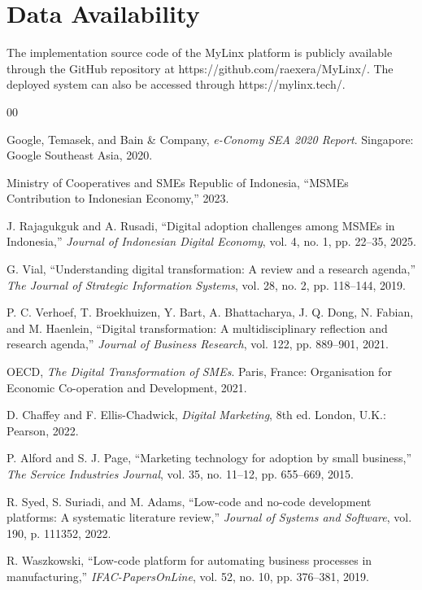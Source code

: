 \documentclass[conference]{IEEEtran}
\begin{document}
\section*{Data Availability}

The implementation source code of the MyLinx platform is publicly available through the GitHub repository at https://github.com/raexera/MyLinx/. The deployed system can also be accessed through https://mylinx.tech/.

\begin{thebibliography}{00}

 Google, Temasek, and Bain \& Company, \textit{e-Conomy SEA 2020 Report}. Singapore: Google Southeast Asia, 2020.

 Ministry of Cooperatives and SMEs Republic of Indonesia, “MSMEs Contribution to Indonesian Economy,” 2023.

 J. Rajagukguk and A. Rusadi, “Digital adoption challenges among MSMEs in Indonesia,” \textit{Journal of Indonesian Digital Economy}, vol. 4, no. 1, pp. 22--35, 2025.

 G. Vial, “Understanding digital transformation: A review and a research agenda,” \textit{The Journal of Strategic Information Systems}, vol. 28, no. 2, pp. 118--144, 2019.

 P. C. Verhoef, T. Broekhuizen, Y. Bart, A. Bhattacharya, J. Q. Dong, N. Fabian, and M. Haenlein, “Digital transformation: A multidisciplinary reflection and research agenda,” \textit{Journal of Business Research}, vol. 122, pp. 889--901, 2021.

 OECD, \textit{The Digital Transformation of SMEs}. Paris, France: Organisation for Economic Co-operation and Development, 2021.

 D. Chaffey and F. Ellis-Chadwick, \textit{Digital Marketing}, 8th ed. London, U.K.: Pearson, 2022.

 P. Alford and S. J. Page, “Marketing technology for adoption by small business,” \textit{The Service Industries Journal}, vol. 35, no. 11--12, pp. 655--669, 2015.

 R. Syed, S. Suriadi, and M. Adams, “Low-code and no-code development platforms: A systematic literature review,” \textit{Journal of Systems and Software}, vol. 190, p. 111352, 2022.

 R. Waszkowski, “Low-code platform for automating business processes in manufacturing,” \textit{IFAC-PapersOnLine}, vol. 52, no. 10, pp. 376--381, 2019.


\end{thebibliography}
\end{document}
